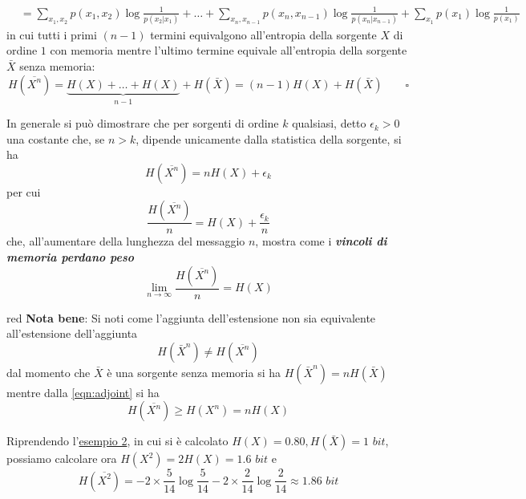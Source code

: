     \begin{tcolorbox}
    \begin{align*}
    &=\sum_{x_1, x_2} p(x_1,x_2) \log \frac{1}{p(x_2|x_1)} + \dots + \sum_{x_n,x_{n-1}} p(x_n,x_{n-1}) \log \frac{1}{p(x_n|x_{n-1})} + \sum_{x_1} p(x_1) \log \frac{1}{p(x_1)}
\end{align*}
in cui tutti i primi $(n-1)$ termini equivalgono all'entropia della sorgente $X$ di ordine $1$ con memoria mentre l'ultimo termine equivale all'entropia della sorgente $\bar{X}$ senza memoria:
\begin{equation*}
    H(\overline{X^n}) = \underbrace{H(X) + \dots + H(X)}_{n-1} + H(\bar{X}) = (n-1)H(X) + H(\bar{X}) \qquad \square
\end{equation*}
\end{tcolorbox}
In generale si pu\`o dimostrare che per sorgenti di ordine $k$ qualsiasi, detto $\epsilon_k > 0$ una costante che, se $n>k$, dipende unicamente dalla statistica della sorgente, si ha
\begin{equation}
    H(\overline{X^n}) = nH(X) + \epsilon_k
\end{equation}
per cui
\begin{equation}
    \frac{H(\overline{X^n})}{n} = H(X) + \frac{\epsilon_k}{n}
\end{equation}
che, all'aumentare della lunghezza del messaggio $n$, mostra come i \textit{\textbf{vincoli di memoria perdano peso}}
\begin{equation}
    \lim_{n \to \infty} \frac{H(\overline{X^n})}{n} = H(X)
\end{equation}
\begin{mybox}{red}{}
\textbf{Nota bene}: Si noti come l'aggiunta dell'estensione non sia equivalente all'estensione dell'aggiunta
\begin{equation}
    H(\bar{X}^n) \neq H(\overline{X^n})
\end{equation}
dal momento che $\bar{X}$ \`e una sorgente senza memoria si ha $H(\bar{X}^n) = n H(\bar{X})$ mentre dalla \ref{eqn:adjoint} si ha
\begin{equation}
    H(\overline{X^n}) \geq H(X^n) = nH(X)
\end{equation}
\end{mybox}
Riprendendo l'\hyperref[fig:markov2]{esempio 2}, in cui si \`e calcolato $H(X) = 0.80, H(\bar{X}) = 1$ $bit$, possiamo calcolare ora $H(X^2) = 2H(X) = 1.6$ $bit$ e
\begin{equation*}
    H(\overline{X^2}) = - 2 \times \frac{5}{14} \log \frac{5}{14} - 2 \times \frac{2}{14}\log \frac{2}{14} \approx 1.86 \hspace{4pt} bit
\end{equation*}

